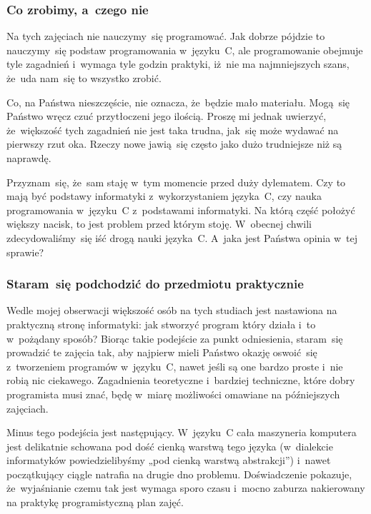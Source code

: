 \documentclass[10pt,t]{beamer}
\begin{document}
\begin{frame}
  \frametitle{Co zrobimy, a~czego nie}


  Na tych zajęciach \alert{nie} nauczymy~się programować. Jak dobrze
  pójdzie to nauczymy~się podstaw programowania w~języku~C, ale
  programowanie obejmuje tyle zagadnień i~wymaga tyle godzin praktyki,
  iż~nie ma najmniejszych szans, że~uda nam~się to \alert{wszystko} zrobić.

  Co, na Państwa nieszczęście, nie oznacza, że~będzie mało materiału.
  Mogą~się Państwo wręcz czuć przytłoczeni jego ilością. Proszę mi jednak
  uwierzyć, że~większość tych zagadnień nie jest taka trudna, jak~się
  może wydawać na pierwszy rzut oka. Rzeczy nowe jawią~się często jako dużo
  trudniejsze niż są naprawdę.

  Przyznam~się, że~sam staję w~tym momencie przed duży dylematem. Czy to
  mają być \alert{podstawy informatyki} z~wykorzystaniem języka~C, czy
  \alert{nauka programowania w~języku~C} z~podstawami informatyki. Na którą
  część położyć większy nacisk, to jest problem przed którym stoję.
  W~obecnej chwili zdecydowaliśmy~się iść drogą nauki języka~C. A~jaka
  jest Państwa opinia w~tej sprawie?

\end{frame}





\begin{frame}
  \frametitle{Staram~się podchodzić do przedmiotu praktycznie}


  Wedle mojej obserwacji większość osób na tych studiach jest nastawiona
  na praktyczną stronę informatyki: jak stworzyć program który działa i~to
  w~pożądany sposób? Biorąc takie podejście za punkt odniesienia,
  staram~się prowadzić te zajęcia tak, aby najpierw mieli Państwo okazję
  oswoić~się z~tworzeniem programów w~języku~C, nawet jeśli są one
  bardzo proste i~nie robią nic ciekawego. Zagadnienia teoretyczne
  i~bardziej techniczne, które dobry programista musi znać, będę w~miarę
  możliwości omawiane na późniejszych zajęciach.

  Minus tego podejścia jest następujący. W~języku~C cała maszyneria
  komputera jest delikatnie schowana pod dość cienką warstwą tego języka
  (w~dialekcie informatyków powiedzielibyśmy „pod cienką warstwą
  abstrakcji”) i~nawet początkujący ciągle natrafia na drugie dno problemu.
  Doświadczenie pokazuje, że~wyjaśnianie czemu tak jest wymaga sporo czasu
  i~mocno zaburza nakierowany na praktykę programistyczną plan zajęć.

\end{frame}
\end{document}
